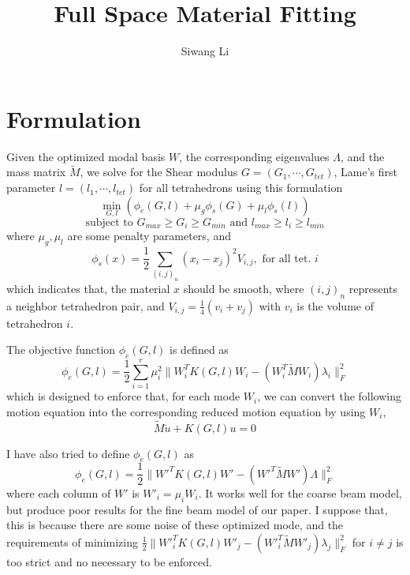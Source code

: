 \documentclass[9pt,twocolumn]{extarticle}
\author{Siwang Li}
\title{Full Space Material Fitting}
\begin{document}
\maketitle

\setlength{\parskip}{0.5ex}

\section{Formulation}
Given the optimized modal basis $W$, the corresponding eigenvalues $\Lambda$,
and the mass matrix $\tilde{M}$, we solve for the Shear modulus
$G=(G_1,\cdots,G_{tet})$, Lame's first parameter $l=(l_1,\cdots,l_{tet})$ for
all tetrahedrons using this formulation
\begin{equation} \label{all}
  \min_{G,l}(\phi_e(G,l)+\mu_{g}\phi_s(G)+\mu_{l}\phi_s(l))
\end{equation}
\[
\mbox{subject to }  G_{max} \ge G_i\ge G_{min} \mbox{ and } l_{max} \ge l_i\ge l_{min}
\]
where $\mu_g, \mu_l$ are some penalty parameters, and
\begin{equation} \label{smooth}
  \phi_s(x) = \frac{1}{2}\sum_{(i,j)_{n}}(x_i-x_j)^2V_{i,j}, \mbox{ for all
    tet. }i
\end{equation}
which indicates that, the material $x$ should be smooth, where $(i,j)_{n}$ represents a
neighbor tetrahedron pair, and $V_{i,j}=\frac{1}{4}(v_i+v_j)$ with $v_i$ is the
volume of tetrahedron $i$. 

The objective function $\phi_e(G,l)$ is defined as
\begin{equation} \label{diag_k}
  \phi_e(G,l) = \frac{1}{2}\sum_{i=1}^{r}\mu_i^2\|{W}^T_iK(G,l){W}_i-({W}^T_i\tilde{M}{W}_i)\lambda_i\|_F^2
\end{equation}
which is designed to enforce that, for each mode $W_i$, we can convert the
following motion equation into the corresponding reduced motion equation by
using $W_i$, 
\begin{equation} \label{motion_eq}
  \tilde{M}\ddot{u} + K(G,l)u = 0
\end{equation}

I have also tried to define $\phi_e(G,l)$ as
\begin{equation} \label{dk}
  \phi_e(G,l)=\frac{1}{2}\|{W'}^TK(G,l){W'}-({W'}^T\tilde{M}{W'})\Lambda\|_F^2
\end{equation}
where each column of $W'$ is $W'_i = \mu_iW_i$. It works well for the coarse beam
model, but produce poor results for the fine beam model of our paper. I suppose
that, this is because there are some noise of these optimized mode, and the
requirements of minimizing
$\frac{1}{2}\|{W'}^T_iK(G,l){W'}_j-({W'}^T_i\tilde{M}{W'}_j)\lambda_j\|_F^2$ for
$i \neq j$ is too strict and no necessary to be enforced.
\end{document}

